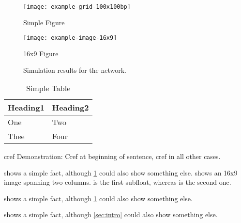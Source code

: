 \documentclass[conference]{IEEEtran}
\begin{document}
\begin{figure}
  \texttt{[image: example-grid-100x100bp]}
  \caption{Simple Figure}
  \label{fig:simple}
\end{figure}

\begin{figure*}
  \centering
  \texttt{[image: example-image-16x9]}
  \caption{16x9 Figure}
  \label{fig:16x9}
\end{figure*}

\begin{figure*}[!b]
  \centering
  \hfil
  \caption{Simulation results for the network.}
  \label{fig_sim}
\end{figure*}

\begin{table}
  \caption{Simple Table}
  \label{tab:simple}
  \centering
  \begin{tabular}{ll}
    \toprule
    Heading1 & Heading2 \\
    \midrule
    One      & Two      \\
    Thee     & Four     \\
    \bottomrule
  \end{tabular}
\end{table}

cref Demonstration: Cref at beginning of sentence, cref in all other cases.

 shows a simple fact, although \cref{fig:simple} could also show something else.
 shows an 16x9 image spanning two columns.
 is the first subfloat, whereas  is the second one.

 shows a simple fact, although \cref{tab:simple} could also show something else.

 shows a simple fact, although \cref{sec:intro} could also show something else.
\end{document}
